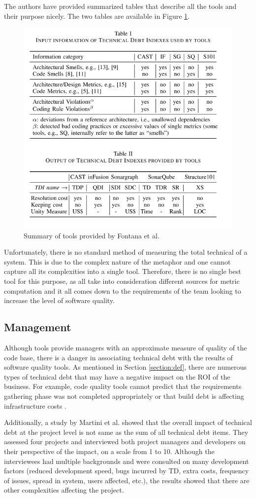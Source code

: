 \documentclass{mprop}
\begin{document}
The authors have provided summarized tables that describe all the tools and
their purpose nicely. The two tables are available in Figure \ref{fig:tools-tables}.

\begin{figure}
	\centering
	\includegraphics[width=0.5\linewidth]{visualisations/tools-table.png}
	\caption{Summary of tools provided by Fontana et al.}
	\label{fig:tools-tables}
\end{figure}

Unfortunately, there is no standard method of measuring the total technical of a
system. This is due to the complex nature of the metaphor and one cannot capture
all its complexities into a single tool. Therefore, there is no single best tool
for this purpose, as all take into consideration different sources for metric
computation and it all comes down to the requirements of the team looking to
increase the level of software quality.

\subsection{Management}

Although tools provide managers with an approximate measure of quality of the
code base, there is a danger in associating technical debt with the results of
software quality tools. As mentioned in Section \ref{section:def}, there
are numerous types of technical debt that may have a negative impact on the ROI
of the business. For example, code quality tools cannot predict that the
requirements gathering phase was not completed appropriately or that build debt
is affecting infrastructure costs \cite{Morgenthaler2012}.

Additionally, a study by Martini et al. \cite{Martini2017} showed that the
overall impact of technical debt at the project level is not same as the sum of
all technical debt items. They assessed four projects and interviewed both
project managers and developers on their perspective of the impact, on a scale
from 1 to 10. Although the interviewees had multiple backgrounds and were
consulted on many development factors (reduced development speed, bugs incurred
by TD, extra costs, frequency of issues, spread in system, users affected,
etc.), the results showed that there are other complexities affecting the
project.
\end{document}
